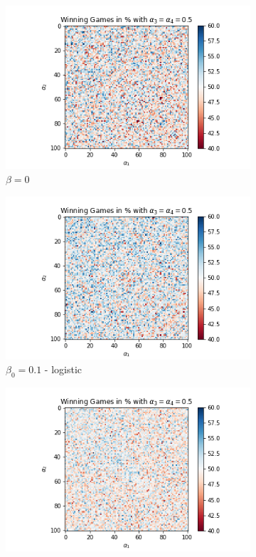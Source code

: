 \begin{figure}[!hb]
	\centering
	\begin{subfigure}{0.3\textwidth}
	    \centering
	    \includegraphics[width=1\linewidth]{Bilder/simulation_2_2}
	    \caption{$\beta=0$}
	    \label{fig:19}
    \end{subfigure}%
	\begin{subfigure}{0.3\textwidth}
	    \centering
	    \includegraphics[width=1\linewidth]{Bilder/simulation_3_2}
	    \caption{$\beta_0=0.1$ - logistic}
	    \label{fig:20}
    \end{subfigure}%
	\begin{subfigure}{0.3\textwidth}
	    \centering
	    \includegraphics[width=1\linewidth]{Bilder/simulation_4_2}

\end{subfigure}
\end{figure}
